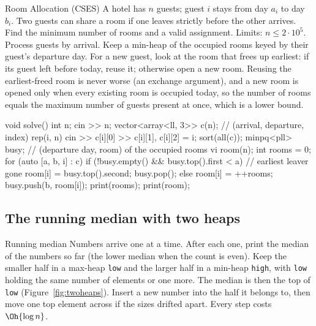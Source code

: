 \begin{problem}{Room Allocation (CSES)}
A hotel has $n$ guests; guest $i$ stays from day $a_i$ to day $b_i$. Two guests can share a room if one leaves strictly
before the other arrives. Find the minimum number of rooms and a valid assignment. Limits: $n \le 2 \cdot 10^5$.
\solution Process guests by arrival. Keep a min-heap of the occupied rooms keyed by their guest's departure day. For a new
guest, look at the room that frees up earliest: if its guest left before today, reuse it; otherwise open a new room. Reusing
the earliest-freed room is never worse (an exchange argument), and a new room is opened only when every existing room is
occupied today, so the number of rooms equals the maximum number of guests present at once, which is a lower bound.
\end{problem}

\begin{code}
void solve() {
    int n;
    cin >> n;
    vector<array<ll, 3>> c(n);  // (arrival, departure, index)
    rep(i, n) cin >> c[i][0] >> c[i][1], c[i][2] = i;
    sort(all(c));
    minpq<pll> busy;  // (departure day, room) of the occupied rooms
    vi room(n);
    int rooms = 0;
    for (auto [a, b, i] : c) {
        if (!busy.empty() && busy.top().first < a) {  // earliest leaver gone
            room[i] = busy.top().second;
            busy.pop();
        } else room[i] = ++rooms;
        busy.push({b, room[i]});
    }
    print(rooms);
    print(room);
}
\end{code}

\subsection{The running median with two heaps}

\begin{problem}{Running median}
Numbers arrive one at a time. After each one, print the median of the numbers so far (the lower median when the count is
even).
\solution Keep the smaller half in a max-heap \texttt{low} and the larger half in a min-heap \texttt{high}, with
\texttt{low} holding the same number of elements or one more. The median is then the top of \texttt{low}
(Figure~\ref{fig:twoheaps}). Insert a new number into the half it belongs to, then move one top element across if the sizes
drifted apart. Every step costs $\Oh{\log n}$.
\end{problem}

